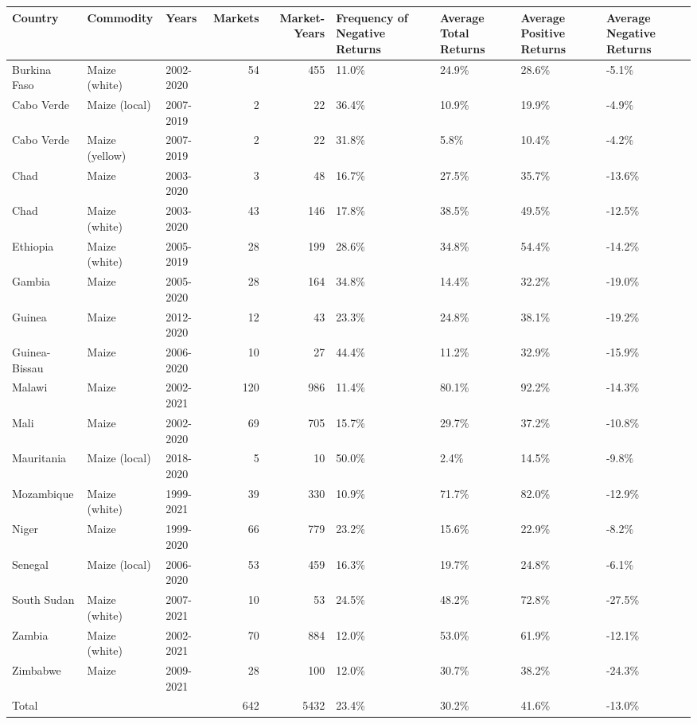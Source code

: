 \begin{table}[ht]
\centering
\begin{tabular}{lllrrllll}
  \hline
Country & Commodity & Years & Markets & Market-Years & Frequency of Negative Returns & Average Total Returns & Average Positive Returns & Average Negative Returns \\ 
  \hline
Burkina Faso & Maize (white) & 2002-2020 &  54 & 455 & 11.0\% & 24.9\% & 28.6\% & -5.1\% \\ 
  Cabo Verde & Maize (local) & 2007-2019 &   2 &  22 & 36.4\% & 10.9\% & 19.9\% & -4.9\% \\ 
  Cabo Verde & Maize (yellow) & 2007-2019 &   2 &  22 & 31.8\% & 5.8\% & 10.4\% & -4.2\% \\ 
  Chad & Maize & 2003-2020 &   3 &  48 & 16.7\% & 27.5\% & 35.7\% & -13.6\% \\ 
  Chad & Maize (white) & 2003-2020 &  43 & 146 & 17.8\% & 38.5\% & 49.5\% & -12.5\% \\ 
  Ethiopia & Maize (white) & 2005-2019 &  28 & 199 & 28.6\% & 34.8\% & 54.4\% & -14.2\% \\ 
  Gambia & Maize & 2005-2020 &  28 & 164 & 34.8\% & 14.4\% & 32.2\% & -19.0\% \\ 
  Guinea & Maize & 2012-2020 &  12 &  43 & 23.3\% & 24.8\% & 38.1\% & -19.2\% \\ 
  Guinea-Bissau & Maize & 2006-2020 &  10 &  27 & 44.4\% & 11.2\% & 32.9\% & -15.9\% \\ 
  Malawi & Maize & 2002-2021 & 120 & 986 & 11.4\% & 80.1\% & 92.2\% & -14.3\% \\ 
  Mali & Maize & 2002-2020 &  69 & 705 & 15.7\% & 29.7\% & 37.2\% & -10.8\% \\ 
  Mauritania & Maize (local) & 2018-2020 &   5 &  10 & 50.0\% & 2.4\% & 14.5\% & -9.8\% \\ 
  Mozambique & Maize (white) & 1999-2021 &  39 & 330 & 10.9\% & 71.7\% & 82.0\% & -12.9\% \\ 
  Niger & Maize & 1999-2020 &  66 & 779 & 23.2\% & 15.6\% & 22.9\% & -8.2\% \\ 
  Senegal & Maize (local) & 2006-2020 &  53 & 459 & 16.3\% & 19.7\% & 24.8\% & -6.1\% \\ 
  South Sudan & Maize (white) & 2007-2021 &  10 &  53 & 24.5\% & 48.2\% & 72.8\% & -27.5\% \\ 
  Zambia & Maize (white) & 2002-2021 &  70 & 884 & 12.0\% & 53.0\% & 61.9\% & -12.1\% \\ 
  Zimbabwe & Maize & 2009-2021 &  28 & 100 & 12.0\% & 30.7\% & 38.2\% & -24.3\% \\ 
  Total &   &   & 642 & 5432 & 23.4\% & 30.2\% & 41.6\% & -13.0\% \\ 
   \hline
\end{tabular}
\end{table}
